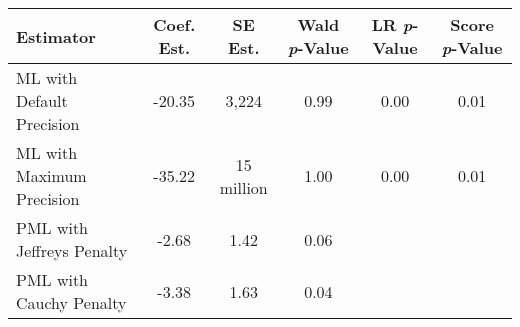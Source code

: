 
\begin{tabular}{lccccc}
\toprule
\textbf{Estimator} & \textbf{Coef. Est.} & \textbf{SE Est.} & \textbf{Wald \textit{p}-Value} & \textbf{LR \textit{p}-Value} & \textbf{Score \textit{p}-Value}\\
\midrule
ML with Default Precision & -20.35 & 3,224 & 0.99 & 0.00 & 0.01\\
ML with Maximum Precision & -35.22 & 15 million & 1.00 & 0.00 & 0.01\\
PML with Jeffreys Penalty & -2.68 & 1.42 & 0.06 &  & \\
PML with Cauchy Penalty & -3.38 & 1.63 & 0.04 &  & \\
\bottomrule
\end{tabular}